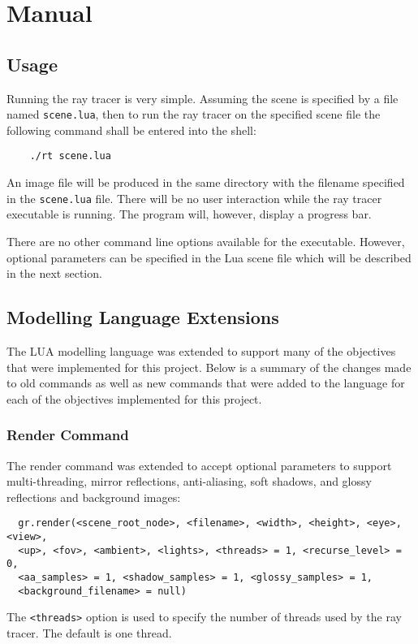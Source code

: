 \chapter{Manual}

\section{Usage}
Running the ray tracer is very simple. Assuming the scene is specified by a file
named \verb|scene.lua|, then to run the ray tracer on the specified scene file
the following command shall be entered into the shell:
\begin{lstlisting}
    ./rt scene.lua
\end{lstlisting}
An image file will be produced in the same directory with the filename specified
in the  \verb|scene.lua| file. There will be no user interaction while the ray
tracer executable is running. The program will, however, display a progress bar.

There are no other command line options available for the executable. However,
optional parameters can be specified in the Lua scene file which will be
described in the next section.

\section{Modelling Language Extensions}
The LUA modelling language was extended to support many of the objectives that
were implemented for this project. Below is a summary of the changes made to old
commands as well as new commands that were added to the language for each of the
objectives implemented for this project.

\subsection*{Render Command}
The render command was extended to accept optional parameters to support
multi-threading, mirror reflections, anti-aliasing, soft shadows, and glossy
reflections and background images:
\begin{lstlisting}
  gr.render(<scene_root_node>, <filename>, <width>, <height>, <eye>, <view>,
  <up>, <fov>, <ambient>, <lights>, <threads> = 1, <recurse_level> = 0,
  <aa_samples> = 1, <shadow_samples> = 1, <glossy_samples> = 1,
  <background_filename> = null)
\end{lstlisting}
The \verb|<threads>| option is used to specify the number of threads used by the
ray tracer. The default is one thread.


